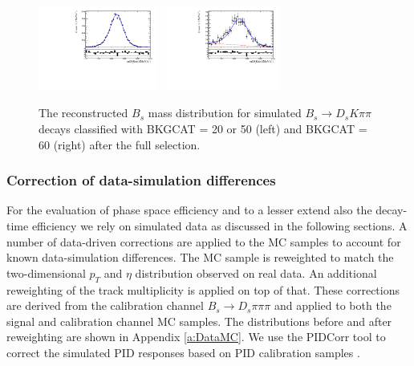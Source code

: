 \begin{figure}[h]
\centering
\includegraphics[height=!,width=0.35\textwidth]{figs/MassFit/signalMC_pull.pdf}
\includegraphics[height=!,width=0.35\textwidth]{figs/MassFit/signalMC_ghost_pull.pdf}


\caption{\small The reconstructed $B_s$ mass distribution for simulated $B_s \to D_s K \pi \pi$  %
decays classified with \textsf{BKGCAT} = 20 or 50 (left) and \textsf{BKGCAT} = 60 (right) after the full selection. }
\label{fig:}
\end{figure}


\subsubsection{Correction of data-simulation differences}

For the evaluation of phase space efficiency and to a lesser extend also the decay-time efficiency we rely on simulated data 
as discussed in the following sections.
A number of data-driven corrections are applied to the MC samples to account for known data-simulation differences.
The MC sample is reweighted to match the two-dimensional $p_T$ and $\eta$ distribution observed on real data.
An additional reweighting of the track multiplicity is applied on top of that.
These corrections are derived from the calibration channel $B_s\to D_s \pi\pi\pi$ and applied to both the signal and calibration channel MC samples.
The distributions before and after reweighting are shown in Appendix \ref{a:DataMC}.
We use the \textsf{PIDCorr} tool to correct the simulated PID responses based on PID calibration samples \cite{LHCb-INT-2017-007}.

